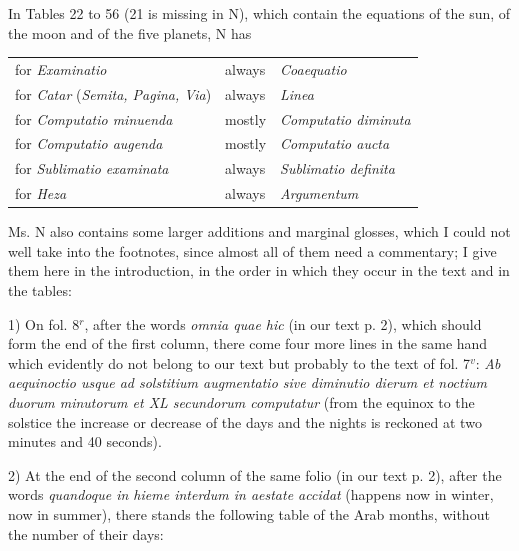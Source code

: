 \documentclass[11pt]{article}
\newcommand{\Pg}[1]{\marginpar{\footnotesize\color{gray}#1}}
\begin{document}
\par In Tables 22 to 56 (21 is missing in N), which contain the equations of the sun, of the moon and of the five planets, N has\par
\begin{center}\small\begin{tabular}{lll}
for \emph{Examinatio} & always & \emph{Coaequatio} \\
for \emph{Catar} (\emph{Semita, Pagina, Via}) & always & \emph{Linea} \\
for \emph{Computatio minuenda} & mostly & \emph{Computatio diminuta} \\
for \emph{Computatio augenda} & mostly & \emph{Computatio aucta} \\
for \emph{Sublimatio examinata} & always & \emph{Sublimatio definita} \\
for \emph{Heza} & always & \emph{Argumentum} \\
\end{tabular}\end{center}
\par Ms. N also contains some larger additions and marginal glosses, which I could not well take into the footnotes, since almost all of them need a commentary; I give them here in the introduction, in the order in which they occur in the text and in the tables:\par
\par 1) On fol. 8$^{r}$, after the words \emph{omnia quae hic} (in our text p. 2), which should form the end of the first column, there come four more lines in the same hand which evidently do not belong to our text but probably to the text of fol. 7$^{v}$: \emph{Ab aequinoctio usque ad solstitium augmentatio sive diminutio dierum et noctium duorum minutorum et XL secundorum computatur} (from the equinox to the solstice the increase or decrease of the days and the nights is reckoned at two minutes and 40 seconds).\par
\par \Pg{XV}2) At the end of the second column of the same folio (in our text p. 2), after the words \emph{quandoque in hieme interdum in aestate accidat} (happens now in winter, now in summer), there stands the following table of the Arab months, without the number of their days:\par
\end{document}
